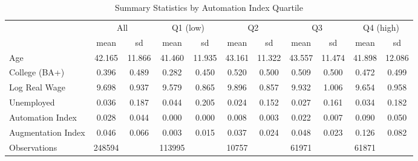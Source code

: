 \begin{table}[htbp]\centering
\def\sym#1{\ifmmode^{#1}\else\(^{#1}\)\fi}
\caption{Summary Statistics by Automation Index Quartile}
\begin{tabular}{l*{5}{cc}}
\toprule
                    &\multicolumn{2}{c}{All}  &\multicolumn{2}{c}{Q1 (low)}&\multicolumn{2}{c}{Q2}   &\multicolumn{2}{c}{Q3}   &\multicolumn{2}{c}{Q4 (high)}\\
                    &        mean&          sd&        mean&          sd&        mean&          sd&        mean&          sd&        mean&          sd\\
\midrule
Age                 &      42.165&      11.866&      41.460&      11.935&      43.161&      11.322&      43.557&      11.474&      41.898&      12.086\\
College (BA+)       &       0.396&       0.489&       0.282&       0.450&       0.520&       0.500&       0.509&       0.500&       0.472&       0.499\\
Log Real Wage       &       9.698&       0.937&       9.579&       0.865&       9.896&       0.857&       9.932&       1.006&       9.654&       0.958\\
Unemployed          &       0.036&       0.187&       0.044&       0.205&       0.024&       0.152&       0.027&       0.161&       0.034&       0.182\\
Automation Index    &       0.028&       0.044&       0.000&       0.000&       0.008&       0.003&       0.022&       0.007&       0.090&       0.050\\
Augmentation Index  &       0.046&       0.066&       0.003&       0.015&       0.037&       0.024&       0.048&       0.023&       0.126&       0.082\\
\midrule
Observations        &      248594&            &      113995&            &       10757&            &       61971&            &       61871&            \\
\bottomrule
\end{tabular}
\end{table}
